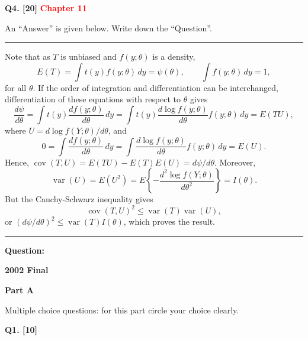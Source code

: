 \documentclass[11pt]{article}
\begin{document}
\clearpage

\textbf{Q4. [20]}  \textbf{\textcolor{red}{Chapter 11}}

An ``Answer'' is given below. Write down the ``Question''.

\medskip
\hrule
\medskip

Note that as $T$ is unbiased and $f(y;\theta)$ is a density,
\[
E(T)=\int t(y)f(y;\theta)\,dy=\psi(\theta),
\qquad
\int f(y;\theta)\,dy=1,
\]
for all $\theta$. If the order of integration and differentiation can be interchanged, differentiation of these equations with respect to $\theta$ gives
\[
\frac{d\psi}{d\theta}
=\int t(y)\frac{df(y;\theta)}{d\theta}\,dy
=\int t(y)\frac{d\log f(y;\theta)}{d\theta}f(y;\theta)\,dy
=E(TU),
\]
where $U=d\log f(Y;\theta)/d\theta$, and
\[
0=\int\frac{df(y;\theta)}{d\theta}\,dy
=\int\frac{d\log f(y;\theta)}{d\theta}f(y;\theta)\,dy
=E(U).
\]
Hence, $\operatorname{cov}(T,U)=E(TU)-E(T)E(U)=d\psi/d\theta$. Moreover,
\[
\operatorname{var}(U)=E(U^2)
=E\!\left\{-\frac{d^2\log f(Y;\theta)}{d\theta^2}\right\}=I(\theta).
\]
But the Cauchy-Schwarz inequality gives
\[
\operatorname{cov}(T,U)^2\leq\operatorname{var}(T)\operatorname{var}(U),
\]
or $(d\psi/d\theta)^2\leq\operatorname{var}(T)I(\theta)$, which proves the result.

\medskip
\hrule
\medskip

\textbf{Question:}


\clearpage

\begin{center}
    {\Large\bfseries 2002 Final}
\end{center}

\vspace{1em}

\begin{center}
\textbf{Part A}
\end{center}

Multiple choice questions: for this part circle your choice clearly.

\textbf{Q1. [10]}
\end{document}
